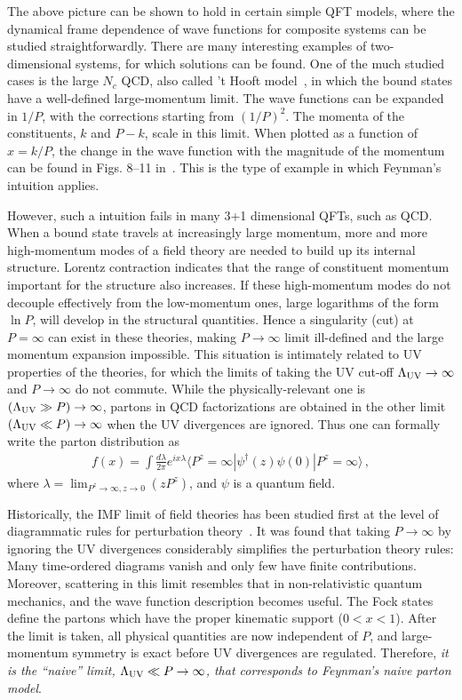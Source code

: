 \documentclass[aps,rmp,reprint,amsmath,amssymb,graphicx,longbibliography]{revtex4-1} %
\begin{document}
The above picture can be shown to hold in certain simple
QFT models, where the dynamical frame dependence of wave functions
for composite systems can be studied straightforwardly.
There are many interesting examples of
two-dimensional systems, for which solutions can be found.
One of the much studied cases is the large $N_c$ QCD, also called
't Hooft model~\cite{tHooft:1974pnl}, in which
the bound states have a well-defined large-momentum limit.
The wave functions can be expanded in
$1/P$, with the corrections starting from $(1/P)^2$.
The momenta of the constituents, $k$ and $P-k$, scale in this
limit. When plotted as a function of $x=k/P$, the change in the
wave function with the magnitude of the momentum can be found
in Figs. 8--11 in~\cite{Jia:2017uul}. This is the type of example
in which Feynman's intuition applies.

However, such a intuition fails in many 3+1 dimensional QFTs, such as QCD.
When a bound state travels at increasingly
large momentum, more and more high-momentum modes of a field theory
are needed to build up its internal structure. Lorentz contraction
indicates that the range of constituent momentum important for the
structure also increases. If these high-momentum modes
do not decouple effectively from the low-momentum ones,
large logarithms of the form $\ln P$, will develop in the structural
quantities. Hence a singularity (cut) at $P=\infty$ can
exist in these theories, making $P\to \infty$ limit ill-defined
and the large momentum expansion impossible. This situation
is intimately related to UV properties of the theories, for which the limits of
taking the UV cut-off $\Lambda_{\rm UV}\to \infty$ and $P\to \infty$
do not commute. While the physically-relevant one is
$(\Lambda_{\rm UV}\gg P)\to \infty$, partons
in QCD factorizations
are obtained in the other limit $(\Lambda_{\rm UV}\ll P)\to \infty$ when
the UV divergences are ignored. Thus one can
formally write the parton distribution as
\begin{align}\label{eq:pd}
	f(x) = \int \frac{d\lambda}{2\pi} e^{ix\lambda}\langle P^z=\infty|\psi^\dagger(z) \psi(0)|P^z=\infty\rangle\,,
\end{align}
where $\lambda = \lim_{P^z\to\infty, z\to 0} (zP^z)$,
and $\psi$ is a quantum field.

Historically, the IMF limit
of field theories has been studied first at the level
of diagrammatic rules for perturbation
theory~\cite{Weinberg:1966jm}. It was found that
taking $P\to\infty$ by ignoring the UV divergences considerably simplifies the perturbation
theory rules: Many time-ordered diagrams vanish and only few
have finite contributions. Moreover, scattering in this limit resembles
that in non-relativistic quantum mechanics, and the wave function
description becomes useful.  The Fock states define
the partons which have the proper kinematic support ($0<x<1$).
After the limit is taken, all physical quantities are
now independent of $P$, and large-momentum symmetry is exact
before UV divergences are regulated. Therefore,
{\it it is the ``naive'' limit, $\Lambda_{\rm UV}\ll P\to \infty$,
	that corresponds to Feynman's naive parton model}.
\end{document}
